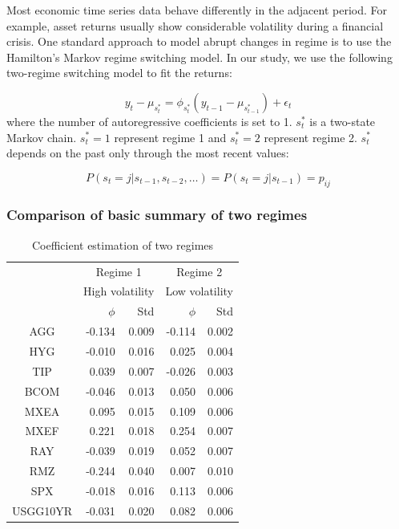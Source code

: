 \documentclass[11pt]{article}
\begin{document}
Most economic time series data behave differently in the adjacent period. For example, asset returns
usually show considerable volatility during a financial crisis. One standard approach to model abrupt changes in regime is to use the Hamilton's Markov regime switching model\cite{hamilton1994time}\cite{hamilton1990analysis}. In our study, we use the following two-regime switching model to fit the returns:

\begin{equation}
y_t - \mu_{s^*_t} = \phi_{s^*_t} (y_{t-1} - \mu_{s^*_{t-1}}) + \epsilon_t
\end{equation}
where the number of autoregressive coefficients is set to 1. $s^*_t$ is a two-state Markov chain. $s^*_t = 1$ represent regime 1 and $s^*_t = 2$ represent regime 2. $s^*_t$ depends on the past only through the most recent values:

\begin{equation}
P(s_t = j|s_{t-1}, s_{t-2}, \dots) = P(s_t = j|s_{t-1})  = p_{ij}
\end{equation}

\subsubsection{Comparison of basic summary of two regimes}

\begin{table}
\centering 
\begin{tabular}{ | c || r r | r r | } 
    \hline
    & \multicolumn{2}{c|}{Regime 1}  & 
    \multicolumn{2}{c|}{Regime 2} \\
     & \multicolumn{2}{c|}{High volatility}  & 
    \multicolumn{2}{c|}{Low volatility} \\
    & $\phi$ & Std & $\phi$ &  Std \\
     \hline \hline
    AGG  & -0.134 & 0.009 & -0.114 & 0.002 \\ 
    HYG & -0.010 & 0.016 & 0.025 & 0.004 \\ 
    TIP &  0.039 & 0.007 & -0.026 & 0.003 \\ 
    BCOM & -0.046 & 0.013 & 0.050 & 0.006 \\ 
    MXEA & 0.095 & 0.015 & 0.109 & 0.006 \\ 
    MXEF & 0.221 & 0.018 & 0.254 & 0.007\\ 
    RAY& -0.039  & 0.019 & 0.052 & 0.007\\ 
    RMZ & -0.244 & 0.040 & 0.007 & 0.010\\ 
    SPX & -0.018 & 0.016 & 0.113 & 0.006\\ 
    USGG10YR & -0.031 & 0.020 & 0.082 & 0.006\\ 
    \hline
\end{tabular}
\caption{Coefficient estimation of two regimes} 
\label{table:autoCoeffRegime}
\end{table} 
\end{document}
